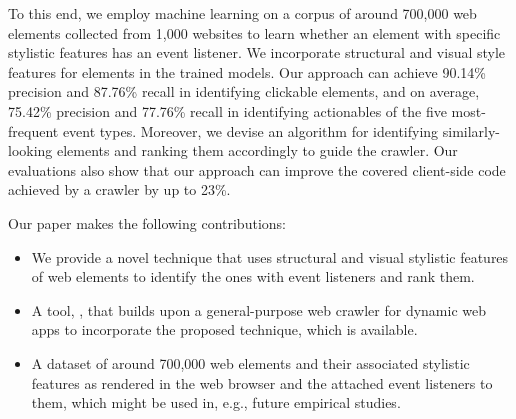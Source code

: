 To this end, we employ machine learning on a corpus of around
700,000 web elements collected from 1,000 websites 
to learn whether an element with specific stylistic features has an event listener.
We incorporate \totalNumberOfFeatures structural and visual style 
features for elements in the trained models.
Our approach can achieve 
90.14\% precision and 87.76\% recall in identifying clickable elements,
and on average, 
75.42\% precision and 77.76\% recall in identifying actionables 
of the five most-frequent event types.
Moreover, we devise an algorithm
for identifying similarly-looking elements
and ranking them accordingly to guide the crawler.
Our evaluations also show that our approach
can improve the covered client-side \js code
achieved by a crawler by up to 23\%.

Our paper makes the following contributions:

\begin{itemize}
	\item We provide a novel technique that uses structural and visual stylistic features of web elements
	to identify the ones with event listeners and rank them.
	\item A tool, \toolName, that builds upon a general-purpose web crawler for dynamic web apps
	to incorporate the proposed technique, which is available.
	\item A dataset of around 700,000 web elements 
	and their associated stylistic features as rendered in the web browser
	and the attached event listeners to them, which might be used in, e.g., future empirical studies.
\end{itemize}
